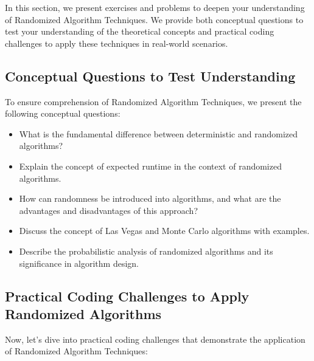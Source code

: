 \documentclass[12pt]{book} %
\begin{document}
In this section, we present exercises and problems to deepen your understanding of Randomized Algorithm Techniques. We provide both conceptual questions to test your understanding of the theoretical concepts and practical coding challenges to apply these techniques in real-world scenarios.

\subsection{Conceptual Questions to Test Understanding}

To ensure comprehension of Randomized Algorithm Techniques, we present the following conceptual questions:

\begin{itemize}
    \item What is the fundamental difference between deterministic and randomized algorithms?
    \item Explain the concept of expected runtime in the context of randomized algorithms.
    \item How can randomness be introduced into algorithms, and what are the advantages and disadvantages of this approach?
    \item Discuss the concept of Las Vegas and Monte Carlo algorithms with examples.
    \item Describe the probabilistic analysis of randomized algorithms and its significance in algorithm design.
\end{itemize}

\subsection{Practical Coding Challenges to Apply Randomized Algorithms}

Now, let's dive into practical coding challenges that demonstrate the application of Randomized Algorithm Techniques:
\end{document}
